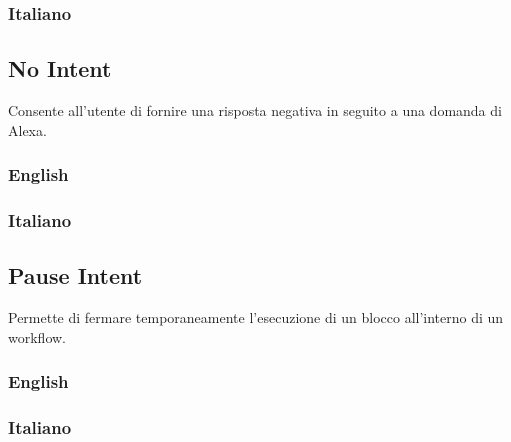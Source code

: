 \subsubsection{Italiano}

\begin{itemize}
	
	
\end{itemize}


\subsection{No Intent}
Consente all'utente di fornire una risposta negativa in seguito a una domanda di Alexa.
\subsubsection{English}
\begin{itemize}
	
	
\end{itemize}

\subsubsection{Italiano}
\begin{itemize}	
	
\end{itemize}



\subsection{Pause Intent}
Permette di fermare temporaneamente l'esecuzione di un blocco all'interno di un workflow.
\subsubsection{English}
\begin{itemize}
	
	
\end{itemize}

\subsubsection{Italiano}
\begin{itemize}
	
	
\end{itemize}


